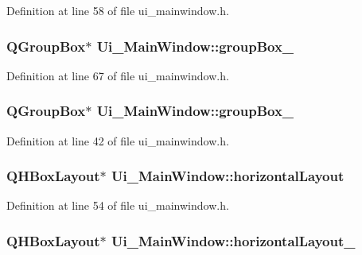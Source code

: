 Definition at line 58 of file ui\-\_\-mainwindow.\-h.

\hypertarget{class_ui___main_window_ad8a919e5634add9c41bfc319cb9fd338}{
\subsubsection[{group\-Box\-\_\-4}]{\setlength{\rightskip}{0pt plus 5cm}Q\-Group\-Box$\ast$ Ui\-\_\-\-Main\-Window\-::group\-Box\-\_}}\label{class_ui___main_window_ad8a919e5634add9c41bfc319cb9fd338}


Definition at line 67 of file ui\-\_\-mainwindow.\-h.

\hypertarget{class_ui___main_window_af87dc4910dc4b3434047edbb31527969}{
\subsubsection[{group\-Box\-\_\-5}]{\setlength{\rightskip}{0pt plus 5cm}Q\-Group\-Box$\ast$ Ui\-\_\-\-Main\-Window\-::group\-Box\-\_}}\label{class_ui___main_window_af87dc4910dc4b3434047edbb31527969}


Definition at line 42 of file ui\-\_\-mainwindow.\-h.

\hypertarget{class_ui___main_window_acd6fdc9ebacc4b25b834162380d75ce8}{
\subsubsection[{horizontal\-Layout}]{\setlength{\rightskip}{0pt plus 5cm}Q\-H\-Box\-Layout$\ast$ Ui\-\_\-\-Main\-Window\-::horizontal\-Layout}}\label{class_ui___main_window_acd6fdc9ebacc4b25b834162380d75ce8}


Definition at line 54 of file ui\-\_\-mainwindow.\-h.

\hypertarget{class_ui___main_window_a03ce63974cc69b067c91bbf285cceca8}{
\subsubsection[{horizontal\-Layout\-\_\-3}]{\setlength{\rightskip}{0pt plus 5cm}Q\-H\-Box\-Layout$\ast$ Ui\-\_\-\-Main\-Window\-::horizontal\-Layout\-\_}}\label{class_ui___main_window_a03ce63974cc69b067c91bbf285cceca8}


